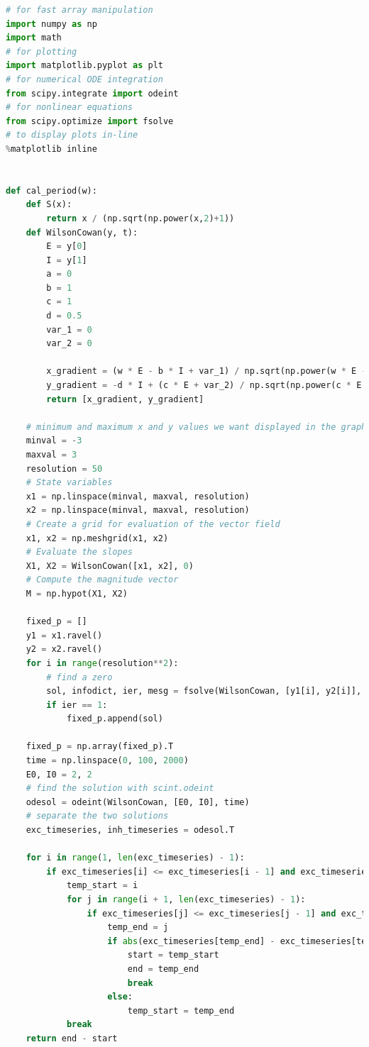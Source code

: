 \documentclass[12pt]{article}
\begin{document}
\begin{lstlisting}[language=Python, caption=Wilson-Cowan Simulation-Python-Run in an IPython Notebook]
# for fast array manipulation
import numpy as np
import math
# for plotting
import matplotlib.pyplot as plt
# for numerical ODE integration
from scipy.integrate import odeint
# for nonlinear equations
from scipy.optimize import fsolve
# to display plots in-line
%matplotlib inline


def cal_period(w):
    def S(x):
        return x / (np.sqrt(np.power(x,2)+1))
    def WilsonCowan(y, t):
        E = y[0]
        I = y[1]
        a = 0
        b = 1
        c = 1
        d = 0.5
        var_1 = 0
        var_2 = 0

        x_gradient = (w * E - b * I + var_1) / np.sqrt(np.power(w * E - b * I + var_1, 2) + 1)
        y_gradient = -d * I + (c * E + var_2) / np.sqrt(np.power(c * E + var_2, 2) + 1)
        return [x_gradient, y_gradient]

    # minimum and maximum x and y values we want displayed in the graph
    minval = -3
    maxval = 3
    resolution = 50
    # State variables
    x1 = np.linspace(minval, maxval, resolution)
    x2 = np.linspace(minval, maxval, resolution)
    # Create a grid for evaluation of the vector field
    x1, x2 = np.meshgrid(x1, x2)
    # Evaluate the slopes
    X1, X2 = WilsonCowan([x1, x2], 0)
    # Compute the magnitude vector
    M = np.hypot(X1, X2)
    
    fixed_p = []
    y1 = x1.ravel()
    y2 = x2.ravel()
    for i in range(resolution**2):
        # find a zero
        sol, infodict, ier, mesg = fsolve(WilsonCowan, [y1[i], y2[i]], args=(0), full_output=1)
        if ier == 1: 
            fixed_p.append(sol)

    fixed_p = np.array(fixed_p).T
    time = np.linspace(0, 100, 2000)
    E0, I0 = 2, 2 
    # find the solution with scint.odeint
    odesol = odeint(WilsonCowan, [E0, I0], time)
    # separate the two solutions
    exc_timeseries, inh_timeseries = odesol.T
    
    for i in range(1, len(exc_timeseries) - 1):
        if exc_timeseries[i] <= exc_timeseries[i - 1] and exc_timeseries[i] <= exc_timeseries[i + 1]:
            temp_start = i
            for j in range(i + 1, len(exc_timeseries) - 1):
                if exc_timeseries[j] <= exc_timeseries[j - 1] and exc_timeseries[j] <= exc_timeseries[j + 1]:
                    temp_end = j
                    if abs(exc_timeseries[temp_end] - exc_timeseries[temp_start]) < 0.2:
                        start = temp_start
                        end = temp_end
                        break
                    else:
                        temp_start = temp_end
            break
    return end - start


\end{lstlisting}
\end{document}
